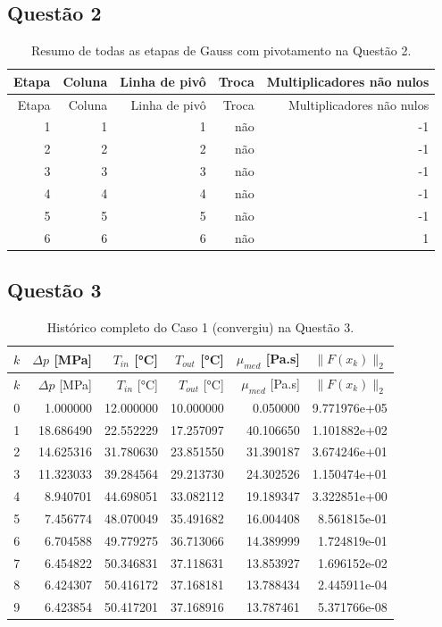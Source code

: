 \subsection*{Questão 2}
\begin{longtable}{rrrrr}
\caption{Resumo de todas as etapas de Gauss com pivotamento na Questão 2.}\label{tab:iter-q2} \\
\toprule
Etapa & Coluna & Linha de pivô & Troca & Multiplicadores não nulos \\
\midrule
\endfirsthead
\toprule
Etapa & Coluna & Linha de pivô & Troca & Multiplicadores não nulos \\
\midrule
\endhead
1 & 1 & 1 & não & -1 \\
2 & 2 & 2 & não & -1 \\
3 & 3 & 3 & não & -1 \\
4 & 4 & 4 & não & -1 \\
5 & 5 & 5 & não & -1 \\
6 & 6 & 6 & não & 1 \\
\bottomrule
\end{longtable}

\subsection*{Questão 3}
\begin{longtable}{rrrrrr}
\caption{Histórico completo do Caso 1 (convergiu) na Questão 3.}\label{tab:iter-q3-1} \\
\toprule
$k$ & $\Delta p$ [MPa] & $T_{in}$ [°C] & $T_{out}$ [°C] & $\mu_{med}$ [Pa.s] & $\lVert F(x_k)\rVert_2$ \\
\midrule
\endfirsthead
\toprule
$k$ & $\Delta p$ [MPa] & $T_{in}$ [°C] & $T_{out}$ [°C] & $\mu_{med}$ [Pa.s] & $\lVert F(x_k)\rVert_2$ \\
\midrule
\endhead
0 & 1.000000 & 12.000000 & 10.000000 & 0.050000 & 9.771976e+05 \\
1 & 18.686490 & 22.552229 & 17.257097 & 40.106650 & 1.101882e+02 \\
2 & 14.625316 & 31.780630 & 23.851550 & 31.390187 & 3.674246e+01 \\
3 & 11.323033 & 39.284564 & 29.213730 & 24.302526 & 1.150474e+01 \\
4 & 8.940701 & 44.698051 & 33.082112 & 19.189347 & 3.322851e+00 \\
5 & 7.456774 & 48.070049 & 35.491682 & 16.004408 & 8.561815e-01 \\
6 & 6.704588 & 49.779275 & 36.713066 & 14.389999 & 1.724819e-01 \\
7 & 6.454822 & 50.346831 & 37.118631 & 13.853927 & 1.696152e-02 \\
8 & 6.424307 & 50.416172 & 37.168181 & 13.788434 & 2.445911e-04 \\
9 & 6.423854 & 50.417201 & 37.168916 & 13.787461 & 5.371766e-08 \\
\bottomrule
\end{longtable}

